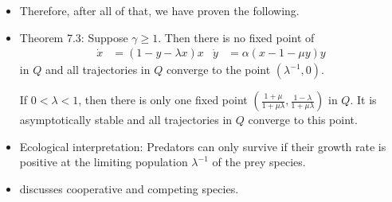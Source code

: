 \documentclass[../notes.tex]{subfiles}
\begin{document}
\begin{itemize}
    \item Therefore, after all of that, we have proven the following.
    \item Theorem 7.3: Suppose $\gamma\geq 1$. Then there is no fixed point of
    \begin{align*}
        \dot{x} &= (1-y-\lambda x)x&
        \dot{y} &= \alpha(x-1-\mu y)y
    \end{align*}
    in $Q$ and all trajectories in $Q$ converge to the point $(\lambda^{-1},0)$.\par
    If $0<\lambda<1$, then there is only one fixed point $(\frac{1+\mu}{1+\mu\lambda},\frac{1-\lambda}{1+\mu\lambda})$ in $Q$. It is asymptotically stable and all trajectories in $Q$ converge to this point.
    \item Ecological interpretation: Predators can only survive if their growth rate is positive at the limiting population $\lambda^{-1}$ of the prey species.
    \item \textcite{bib:Teschl} discusses cooperative and competing species.
\end{itemize}
\end{document}

